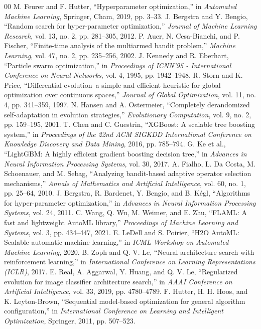 \documentclass[conference]{IEEEtran}
\begin{document}
\begin{thebibliography}{00}
 M. Feurer and F. Hutter, ``Hyperparameter optimization,'' in \textit{Automated Machine Learning}, Springer, Cham, 2019, pp. 3--33.
 J. Bergstra and Y. Bengio, ``Random search for hyper-parameter optimization,'' \textit{Journal of Machine Learning Research}, vol. 13, no. 2, pp. 281--305, 2012.
 P. Auer, N. Cesa-Bianchi, and P. Fischer, ``Finite-time analysis of the multiarmed bandit problem,'' \textit{Machine Learning}, vol. 47, no. 2, pp. 235--256, 2002.
 J. Kennedy and R. Eberhart, ``Particle swarm optimization,'' in \textit{Proceedings of ICNN'95 - International Conference on Neural Networks}, vol. 4, 1995, pp. 1942--1948.
 R. Storn and K. Price, ``Differential evolution--a simple and efficient heuristic for global optimization over continuous spaces,'' \textit{Journal of Global Optimization}, vol. 11, no. 4, pp. 341--359, 1997.
 N. Hansen and A. Ostermeier, ``Completely derandomized self-adaptation in evolution strategies,'' \textit{Evolutionary Computation}, vol. 9, no. 2, pp. 159--195, 2001.
 T. Chen and C. Guestrin, ``XGBoost: A scalable tree boosting system,'' in \textit{Proceedings of the 22nd ACM SIGKDD International Conference on Knowledge Discovery and Data Mining}, 2016, pp. 785--794.
 G. Ke et al., ``LightGBM: A highly efficient gradient boosting decision tree,'' in \textit{Advances in Neural Information Processing Systems}, vol. 30, 2017.
 A. Fialho, L. Da Costa, M. Schoenauer, and M. Sebag, ``Analyzing bandit-based adaptive operator selection mechanisms,'' \textit{Annals of Mathematics and Artificial Intelligence}, vol. 60, no. 1, pp. 25--64, 2010.
 J. Bergstra, R. Bardenet, Y. Bengio, and B. K{\'e}gl, ``Algorithms for hyper-parameter optimization,'' in \textit{Advances in Neural Information Processing Systems}, vol. 24, 2011.
 C. Wang, Q. Wu, M. Weimer, and E. Zhu, ``FLAML: A fast and lightweight AutoML library,'' \textit{Proceedings of Machine Learning and Systems}, vol. 3, pp. 434--447, 2021.
 E. LeDell and S. Poirier, ``H2O AutoML: Scalable automatic machine learning,'' in \textit{ICML Workshop on Automated Machine Learning}, 2020.
 B. Zoph and Q. V. Le, ``Neural architecture search with reinforcement learning,'' in \textit{International Conference on Learning Representations (ICLR)}, 2017.
 E. Real, A. Aggarwal, Y. Huang, and Q. V. Le, ``Regularized evolution for image classifier architecture search,'' in \textit{AAAI Conference on Artificial Intelligence}, vol. 33, 2019, pp. 4780--4789.
 F. Hutter, H. H. Hoos, and K. Leyton-Brown, ``Sequential model-based optimization for general algorithm configuration,'' in \textit{International Conference on Learning and Intelligent Optimization}, Springer, 2011, pp. 507--523.
\end{thebibliography}
\end{document}

